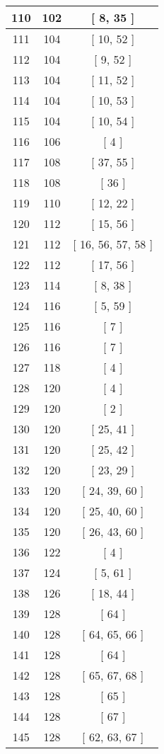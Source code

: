 \begin{center}
\begin{longtable}[H]{|| c c c ||}
\hline
110 & 102 & [ 8, 35 ] \\ 
\hline
111 & 104 & [ 10, 52 ] \\ 
\hline
112 & 104 & [ 9, 52 ] \\ 
\hline
113 & 104 & [ 11, 52 ] \\ 
\hline
114 & 104 & [ 10, 53 ] \\ 
\hline
115 & 104 & [ 10, 54 ] \\ 
\hline
116 & 106 & [ 4 ] \\ 
\hline
117 & 108 & [ 37, 55 ] \\ 
\hline
118 & 108 & [ 36 ] \\ 
\hline
119 & 110 & [ 12, 22 ] \\ 
\hline
120 & 112 & [ 15, 56 ] \\ 
\hline
121 & 112 & [ 16, 56, 57, 58 ] \\ 
\hline
122 & 112 & [ 17, 56 ] \\ 
\hline
123 & 114 & [ 8, 38 ] \\ 
\hline
124 & 116 & [ 5, 59 ] \\ 
\hline
125 & 116 & [ 7 ] \\ 
\hline
126 & 116 & [ 7 ] \\ 
\hline
127 & 118 & [ 4 ] \\ 
\hline
128 & 120 & [ 4 ] \\ 
\hline
129 & 120 & [ 2 ] \\ 
\hline
130 & 120 & [ 25, 41 ] \\ 
\hline
131 & 120 & [ 25, 42 ] \\ 
\hline
132 & 120 & [ 23, 29 ] \\ 
\hline
133 & 120 & [ 24, 39, 60 ] \\ 
\hline
134 & 120 & [ 25, 40, 60 ] \\ 
\hline
135 & 120 & [ 26, 43, 60 ] \\ 
\hline
136 & 122 & [ 4 ] \\ 
\hline
137 & 124 & [ 5, 61 ] \\ 
\hline
138 & 126 & [ 18, 44 ] \\ 
\hline
139 & 128 & [ 64 ] \\ 
\hline
140 & 128 & [ 64, 65, 66 ] \\ 
\hline
141 & 128 & [ 64 ] \\ 
\hline
142 & 128 & [ 65, 67, 68 ] \\ 
\hline
143 & 128 & [ 65 ] \\ 
\hline
144 & 128 & [ 67 ] \\ 
\hline
145 & 128 & [ 62, 63, 67 ] \\ 

\end{longtable}
\end{center}
